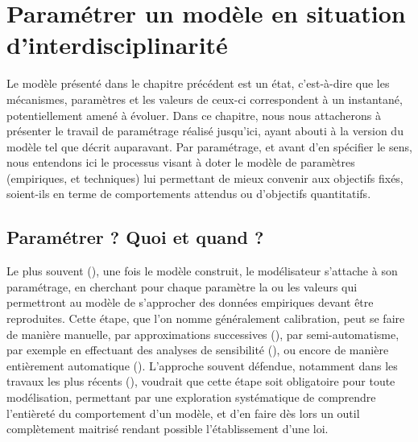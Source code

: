 \documentclass[12pt, a4paper, oneside]{book}
\begin{document}
\setcounter{part}{0}
\setcounter{chapter}{2}

\chapter{Paramétrer un modèle en situation d'interdisciplinarité}

Le modèle présenté dans le chapitre précédent est un \og état\fg{}, c'est-à-dire que les mécanismes, paramètres et les valeurs de ceux-ci correspondent à un instantané, potentiellement amené à évoluer.
Dans ce chapitre, nous nous attacherons à présenter le travail de paramétrage réalisé jusqu'ici, ayant abouti à la version du modèle tel que décrit auparavant.
Par paramétrage, et avant d'en spécifier le sens, nous entendons ici le processus visant à doter le modèle de paramètres (empiriques,  et techniques) lui permettant de mieux convenir aux objectifs fixés, soient-ils en terme de comportements attendus ou d'objectifs quantitatifs.

\section{Paramétrer ? Quoi et quand ?}

Le plus souvent (), une fois le modèle construit, le modélisateur s'attache à son paramétrage, en cherchant pour chaque paramètre la ou les valeurs qui permettront au modèle de s'approcher des données empiriques devant être reproduites.
Cette étape, que l'on nomme généralement calibration, peut se faire de manière manuelle, par approximations successives (), par semi-automatisme, par exemple en effectuant des analyses de sensibilité (), ou encore de manière entièrement automatique ().
L'approche souvent défendue, notamment dans les travaux les plus récents (), voudrait que cette étape soit obligatoire pour toute modélisation, permettant par une exploration systématique de comprendre l'entièreté du comportement d'un modèle, et d'en faire dès lors un outil complètement maitrisé rendant possible l'établissement d'une loi.
\end{document}
